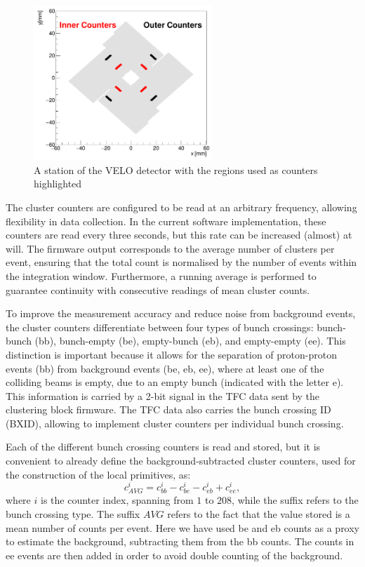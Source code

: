 \begin{figure}
    \centering
    \includegraphics[width=0.6\textwidth]{figures/counters.png}
    \caption{A station of the VELO detector with the regions used as counters highlighted}
    \label{fig:VELO-counters}
\end{figure}

The cluster counters are configured to be read at an arbitrary frequency, allowing flexibility in data collection. In the current software implementation, these counters are read every three seconds, but this rate can be increased (almost) at will.
The firmware output corresponds to the average number of clusters per event, ensuring that the total count is normalised by the number of events within the integration window. Furthermore, a running average is performed to guarantee continuity with consecutive readings of mean cluster counts.

To improve the measurement accuracy and reduce noise from background events, the cluster counters differentiate between four types of bunch crossings: bunch-bunch (bb), bunch-empty (be), empty-bunch (eb), and empty-empty (ee). This distinction is important because it allows for the separation of proton-proton events (bb) from background events (be, eb, ee), where at least one of the colliding beams is empty, due to an empty bunch (indicated with the letter e). This information is carried by a 2-bit signal in the TFC data sent by the clustering block firmware. The TFC data also carries the bunch crossing ID (BXID), allowing to implement cluster counters per individual bunch crossing.

Each of the different bunch crossing counters is read and stored, but it is convenient to already define the background-subtracted cluster counters, used for the construction of the local primitives, as: 
\begin{equation}
    c^i_{AVG} = c^i_{bb} - c^i_{be} - c^i_{eb} + c^i_{ee},
\end{equation}
where $i$ is the counter index, spanning from $1$ to $208$, while the suffix refers to the bunch crossing type. The suffix $AVG$ refers to the fact that the value stored is a mean number of counts per event.
Here we have used be and eb counts as a proxy to estimate the background, subtracting them from the bb counts. The counts in ee events are then added in order to avoid double counting of the background.

